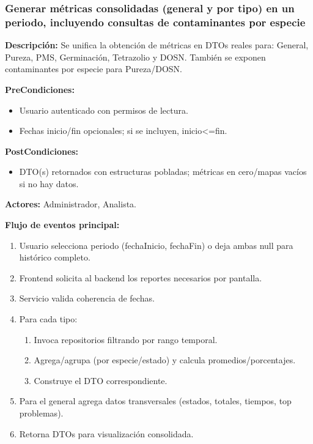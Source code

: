 \subsubsection{Generar métricas consolidadas (general y por tipo) en un periodo, incluyendo consultas de contaminantes por especie}

\textbf{Descripción:} Se unifica la obtención de métricas en DTOs reales para: General, Pureza, PMS, Germinación, Tetrazolio y DOSN. También se exponen contaminantes por especie para Pureza/DOSN.

\vspace{0.5em}
\noindent\textbf{PreCondiciones:}
\begin{itemize}[nosep]
   \item Usuario autenticado con permisos de lectura.
   \item Fechas inicio/fin opcionales; si se incluyen, inicio<=fin.
\end{itemize}

\vspace{0.5em}
\noindent\textbf{PostCondiciones:}
\begin{itemize}[nosep]
   \item DTO(s) retornados con estructuras pobladas; métricas en cero/mapas vacíos si no hay datos.
\end{itemize}

\vspace{0.5em}
\noindent\textbf{Actores:} Administrador, Analista.

\vspace{0.5em}
\noindent\textbf{Flujo de eventos principal:}
\begin{enumerate}[nosep]
   \item Usuario selecciona periodo (fechaInicio, fechaFin) o deja ambas null para histórico completo.
   \item Frontend solicita al backend los reportes necesarios por pantalla.
   \item Servicio valida coherencia de fechas.
   \item Para cada tipo:
   \begin{enumerate}[nosep]
      \item Invoca repositorios filtrando por rango temporal.
      \item Agrega/agrupa (por especie/estado) y calcula promedios/porcentajes.
      \item Construye el DTO correspondiente.
   \end{enumerate}
   \item Para el general agrega datos transversales (estados, totales, tiempos, top problemas).
   \item Retorna DTOs para visualización consolidada.
\end{enumerate}


